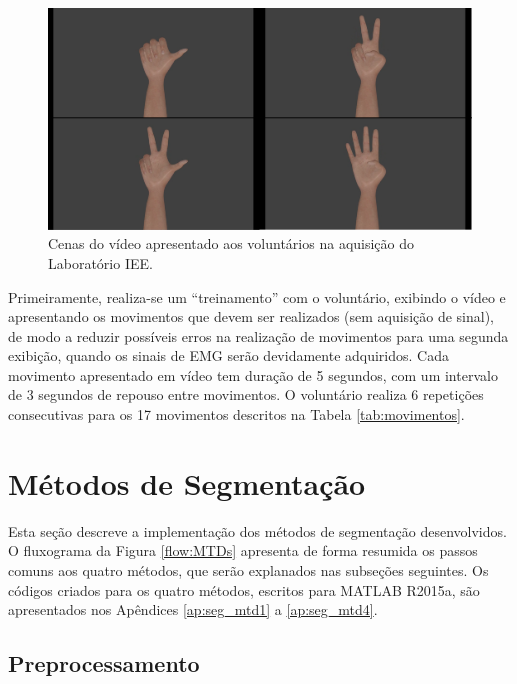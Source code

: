 \begin{figure}[htb]
	\caption{\label{fig:video}Cenas do vídeo apresentado aos voluntários na aquisição do Laboratório IEE.}
	\begin{center}
	    \includegraphics[width=0.75\linewidth]{./img/scenes.png}
	\end{center}
\end{figure}

Primeiramente, realiza-se um ``treinamento'' com o voluntário, exibindo o vídeo e apresentando os movimentos que devem ser realizados (sem aquisição de sinal), de modo a reduzir possíveis erros na realização de movimentos para uma segunda exibição, quando os sinais de EMG serão devidamente adquiridos. Cada movimento apresentado em vídeo tem duração de 5 segundos, com um intervalo de 3 segundos de repouso entre movimentos. O voluntário realiza 6 repetições consecutivas para os 17 movimentos descritos na Tabela \ref{tab:movimentos}.



		\section{Métodos de Segmentação}
Esta seção descreve a implementação dos métodos de segmentação desenvolvidos. O fluxograma da Figura \ref{flow:MTDs} apresenta de forma resumida os passos comuns aos quatro métodos, que serão explanados nas subseções seguintes. Os códigos criados para os quatro métodos, escritos para MATLAB R2015a, são apresentados nos Apêndices \ref{ap:seg_mtd1} a \ref{ap:seg_mtd4}.



			\subsection {Preprocessamento}

